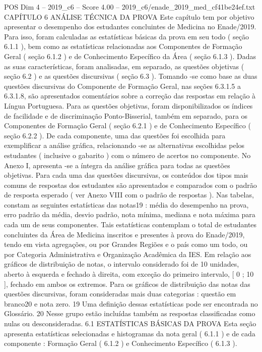 \begin{textsample}{POS Dim 4 – 2019\_c6 – Score 4.00 – 2019\_c6/enade\_2019\_med\_cf41be24ef.txt}  \label{ex:f4_pos_093}
CAPÍTULO 6 ANÁLISE TÉCNICA DA PROVA Este capítulo tem por objetivo apresentar o desempenho dos estudantes concluintes de Medicina no Enade/2019.
Para isso, foram calculadas as estatísticas básicas da prova em seu todo ( seção 6.1.1 ), bem como as estatísticas relacionadas aos Componentes de Formação Geral ( seção 6.1.2 ) e de Conhecimento Específico da Área ( seção 6.1.3 ).
Dadas as suas características, foram analisadas, em separado, as questões objetivas ( seção 6.2 ) e as questões discursivas ( seção 6.3 ).
Tomando -se como base as duas questões discursivas do Componente de Formação Geral, nas seções 6.3.1.5 a 6.3.1.8, são apresentados comentários sobre a correção das respostas em relação à Língua Portuguesa.
Para as questões objetivas, foram disponibilizados os índices de facilidade e de discriminação Ponto-Bisserial, também em separado, para os Componentes de Formação Geral ( seção 6.2.1 ) e de Conhecimento Específico ( seção 6.2.2 ).
De cada componente, uma das questões foi escolhida para exemplificar a análise gráfica, relacionando -se as alternativas escolhidas pelos estudantes ( inclusive o gabarito ) com o número de acertos no componente.
No Anexo I, apresenta -se a íntegra da análise gráfica para todas as questões objetivas.
Para cada uma das questões discursivas, os conteúdos dos tipos mais comuns de respostas dos estudantes são apresentados e comparados com o padrão de resposta esperado ( ver Anexo VIII com o padrão de respostas ).
Nas tabelas, constam as seguintes estatísticas das notas19 : média do desempenho na prova, erro padrão da média, desvio padrão, nota mínima, mediana e nota máxima para cada um de seus componentes.
Tais estatísticas contemplam o total de estudantes concluintes da Área de Medicina inscritos e presentes à prova do Enade/2019, tendo em vista agregações, ou por Grandes Regiões e o país como um todo, ou por Categoria Administrativa e Organização Acadêmica da IES.
Em relação aos gráficos de distribuição de notas, o intervalo considerado foi de 10 unidades, aberto à esquerda e fechado à direita, com exceção do primeiro intervalo, [ 0 ; 10 ], fechado em ambos os extremos.
Para os gráficos de distribuição das notas das questões discursivas, foram consideradas mais duas categorias : questão em branco20 e nota zero. 19 Uma definição dessas estatísticas pode ser encontrada no Glossário. 20 Nesse grupo estão incluídas também as respostas classificadas como nulas ou desconsideradas. 6.1 ESTATÍSTICAS BÁSICAS DA PROVA Esta seção apresenta estatísticas selecionadas e histogramas da nota geral ( 6.1.1 ) e de cada componente : Formação Geral ( 6.1.2 ) e Conhecimento Específico ( 6.1.3 ).

\end{textsample}
